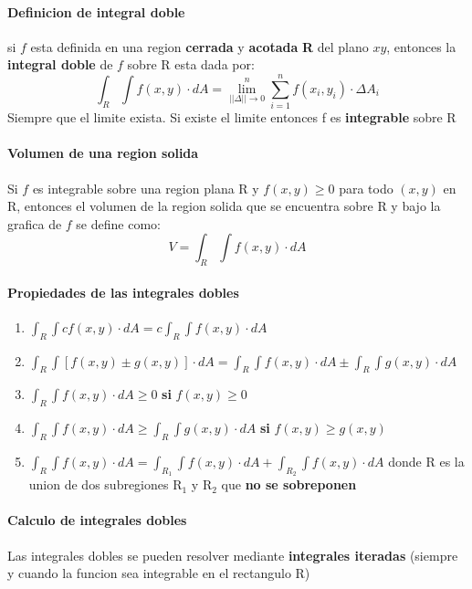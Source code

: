 \documentclass[11pt]{article}
\begin{document}
\paragraph{Definicion de integral doble}
si $f$ esta definida en una region \textbf{cerrada} y \textbf{acotada} \textbf{R} del plano $xy$, entonces la \textbf{integral doble} de $f$ sobre R esta dada por:
\begin{equation*}
	\int_R \int f(x,y) \cdot dA = \lim_{||\Delta||\rightarrow0}^n \sum_{i=1}^n f(x_i, y_i) \cdot \Delta A_i
\end{equation*}
Siempre que el limite exista. Si existe el limite entonces f es \textbf{integrable} sobre R
\paragraph{Volumen de una region solida}
Si $f$ es integrable sobre una region plana R y $f(x, y) \geq 0$ para todo $(x, y)$ en R, entonces el volumen de la region solida que se encuentra sobre R y bajo la grafica de $f$ se define como:
\begin{equation*}
	V = \int_R \int f(x, y) \cdot dA
\end{equation*}
\paragraph{Propiedades de las integrales dobles}
\begin{enumerate}
	\item $\int_R \int cf(x, y) \cdot dA = c\int_R \int f(x, y) \cdot dA$
	\item $\int_R \int [f(x, y) \pm g(x, y)] \cdot dA = \int_R \int f(x, y) \cdot dA \pm \int_R \int g(x, y) \cdot dA$
	\item $\int_R \int f(x, y) \cdot dA \geq 0 $ \textbf{si} $f(x, y) \geq 0$
	\item $\int_R \int f(x, y) \cdot dA \geq \int_R \int g(x, y) \cdot dA$ \textbf{si} $f(x, y) \geq g(x,y)$
	\item $\int_R \int f(x, y) \cdot dA = \int_{R_1} \int f(x, y) \cdot dA + \int_{R_2} \int f(x, y) \cdot dA$ donde R es la union de dos subregiones R$_1$ y R$_2$ que \textbf{no se sobreponen}
\end{enumerate}
\paragraph{Calculo de integrales dobles}
Las integrales dobles se pueden resolver mediante \textbf{integrales iteradas} (siempre y cuando la funcion sea integrable en el rectangulo R)
\end{document}
